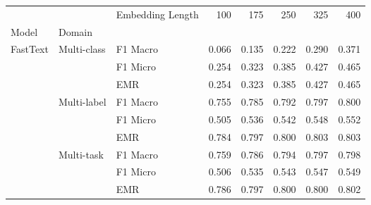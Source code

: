 \begin{tabular}{lllrrrrr}
\toprule
         &             & Embedding Length &    100 &    175 &    250 &    325 &    400 \\
Model & Domain & {} &        &        &        &        &        \\
\midrule
\multirow{9}{*}{FastText} & \multirow{3}{*}{Multi-class} &  F1 Macro &  0.066 &  0.135 &  0.222 &  0.290 &  0.371 \\
         &             & F1 Micro &  0.254 &  0.323 &  0.385 &  0.427 &  0.465 \\
         &             & EMR &  0.254 &  0.323 &  0.385 &  0.427 &  0.465 \\
\cmidrule(lr){2-8}
         & \multirow{3}{*}{Multi-label} &  F1 Macro &  0.755 &  0.785 &  0.792 &  0.797 &  0.800 \\
         &             & F1 Micro &  0.505 &  0.536 &  0.542 &  0.548 &  0.552 \\
         &             & EMR &  0.784 &  0.797 &  0.800 &  0.803 &  0.803 \\
\cmidrule(lr){2-8}
         & \multirow{3}{*}{Multi-task} &  F1 Macro &  0.759 &  0.786 &  0.794 &  0.797 &  0.798 \\
         &             & F1 Micro &  0.506 &  0.535 &  0.543 &  0.547 &  0.549 \\
         &             & EMR &  0.786 &  0.797 &  0.800 &  0.800 &  0.802 \\
\bottomrule
\end{tabular}
